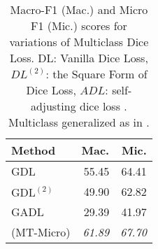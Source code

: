 \documentclass[11pt]{article}
\begin{document}
\begin{table}[h]
    \centering
    \begin{tabular}{|l|rr|}
    \hline
    Method &  Mac. &  Mic. \\
    \hline
    GDL   &      55.45 &         64.41 \\
    $\text{GDL}^{(2)}$ &      49.90 &         62.82 \\
    GADL &      29.39 &         41.97 \\
    \hline 
    \hline 
    (MT-Micro) & \textit{61.89} & \textit{67.70} \\
    \hline
    \end{tabular}
    \caption{Macro-F1 (Mac.) and Micro F1 (Mic.) scores for variations of Multiclass Dice Loss. DL: Vanilla Dice Loss, $DL^{(2)}$: the Square Form of Dice Loss, $ADL$: self-adjusting dice loss \cite{li2019dice}. Multiclass generalized as in \cite{sudre2017generalised}.}
    \label{tbl:dice_loss}
\end{table}
\end{document}
